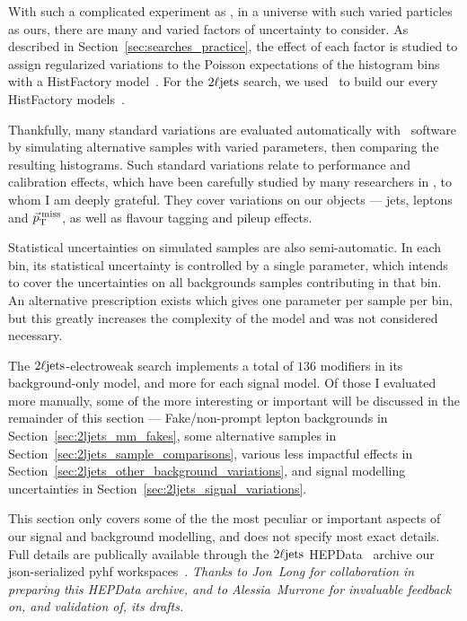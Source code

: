 With such a complicated experiment as \atlas, in a universe with such varied
particles as ours, there are many and varied factors of uncertainty to consider.
As described in Section~\ref{sec:searches_practice}, the effect of each
factor is studied to assign regularized variations to the Poisson expectations
of the histogram bins with a HistFactory model~\cite{cranmer2012histfactory}.
For the $2\ell\mathrm{jets}$ search, we used \histfitter\ to build our every HistFactory
models~\cite{Besjes_2015,baak2015histfitter}.

Thankfully, many standard variations are evaluated automatically with \atlas\
software by simulating alternative samples with varied parameters, then
comparing the resulting histograms.
Such standard variations relate to performance and calibration effects, which
have been carefully studied by many researchers in \atlas, to whom I am deeply
grateful.
They cover variations on our objects --- jets, leptons and $\vec p_\mathrm{T}^\mathrm{\:miss}$, as well
as flavour tagging and pileup effects.

Statistical uncertainties on simulated samples are also semi-automatic.
In each bin, its statistical uncertainty is controlled by a single parameter,
which intends to cover the uncertainties on all backgrounds samples
contributing in that bin.
An alternative prescription exists which gives one parameter per sample per
bin, but this greatly increases the complexity of the model and was not
considered necessary.

The $2\ell\mathrm{jets}$-electroweak search implements a total of $136$ modifiers in its
background-only model, and more for each signal model.
Of those I evaluated more manually, some of the more interesting or important
will be discussed in the remainder of this section ---
Fake/non-prompt lepton backgrounds in Section~\ref{sec:2ljets_mm_fakes},
some alternative samples in Section~\ref{sec:2ljets_sample_comparisons},
various less impactful effects in
Section~\ref{sec:2ljets_other_background_variations},
and signal modelling uncertainties in
Section~\ref{sec:2ljets_signal_variations}.

This section only covers some of the the most peculiar or important aspects
of our signal and background modelling, and does not specify most exact
details.
Full details are publically available through the $2\ell\mathrm{jets}$
HEPData~\cite{hepdata.116034, Maguire_2017} archive our json-serialized pyhf
workspaces~\cite{cranmer2012histfactory, heinrich2021pyhf}.
\emph{Thanks to Jon~Long for collaboration in preparing this HEPData archive,
and to Alessia~Murrone for invaluable feedback on, and validation of, its
drafts.}


